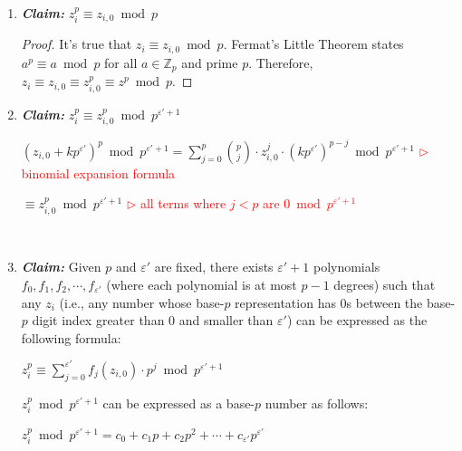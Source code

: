 \begin{enumerate}
\item \textbf{\textit{Claim:}} $z_i^{p} \equiv z_{i,0} \bmod p$ 

\begin{proof}
It's true that $z_i \equiv z_{i,0} \bmod p$. Fermat's Little Theorem states $a^{p} \equiv a \bmod p$ for all $a \in \mathbb{Z}_p$ and prime $p$. Therefore, $z_i \equiv z_{i,0} \equiv z_{i,0}^{p} \equiv z^{p} \bmod p$.
\end{proof}

\item \textbf{\textit{Claim:}} $z_i^p \equiv z_{i, 0}^p \bmod p^{\varepsilon'+1}$ 

\begin{myproof}
$(z_{i,0} + kp^{\varepsilon'})^p \bmod p^{\varepsilon'+1}= \sum\limits_{j=0}^{p}  \binom{p}{j}\cdot  z_{i,0}^{j} \cdot (kp^{\varepsilon'})^{p-j} \bmod p^{\varepsilon'+1}$ \textcolor{red}{ $\rhd$ binomial expansion formula}

$ \equiv z_{i,0}^{p} \bmod p^{\varepsilon' + 1}$ \textcolor{red}{ $\rhd$ all terms where $j < p$ are $0 \bmod p^{\varepsilon' + 1}$}
\end{myproof}

$ $

\item \textbf{\textit{Claim:}} Given $p$ and $\varepsilon'$ are fixed, there exists $\varepsilon'+1$ polynomials $f_0, f_1, f_2, \cdots, f_{\varepsilon'}$ (where each polynomial is at most $p-1$ degrees) such that any $z_i$ (i.e., any number whose base-$p$ representation has 0s between the base-$p$ digit index greater than 0 and smaller than $\varepsilon'$) can be expressed as the following formula:

$z_i^p \equiv \sum\limits_{j=0}^{\varepsilon'}f_j(z_{i,0})\cdot p^j \bmod p^{\varepsilon'+1}$ 



\begin{myproof}
$z_i^p \bmod p^{\varepsilon'+1}$ can be expressed as a base-$p$ number as follows:

$z_i^p \bmod p^{\varepsilon'+1} = c_0 + c_1p + c_2p^2 + \cdots + c_{\varepsilon'}p^{\varepsilon'}$

$ $


\end{myproof}
\end{enumerate}
